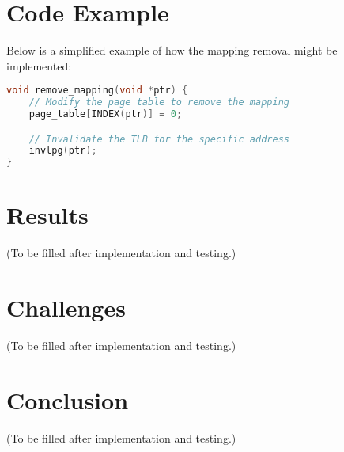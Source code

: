\documentclass[a4paper,12pt]{report}
\begin{document}
\section{Code Example}
Below is a simplified example of how the mapping removal might be implemented:
\begin{lstlisting}[language=C, caption=Removing a Mapping]
void remove_mapping(void *ptr) {
    // Modify the page table to remove the mapping
    page_table[INDEX(ptr)] = 0;

    // Invalidate the TLB for the specific address
    invlpg(ptr);
}
\end{lstlisting}

\section{Results}
(To be filled after implementation and testing.)

\section{Challenges}
(To be filled after implementation and testing.)

\section{Conclusion}
(To be filled after implementation and testing.)
\end{document}
